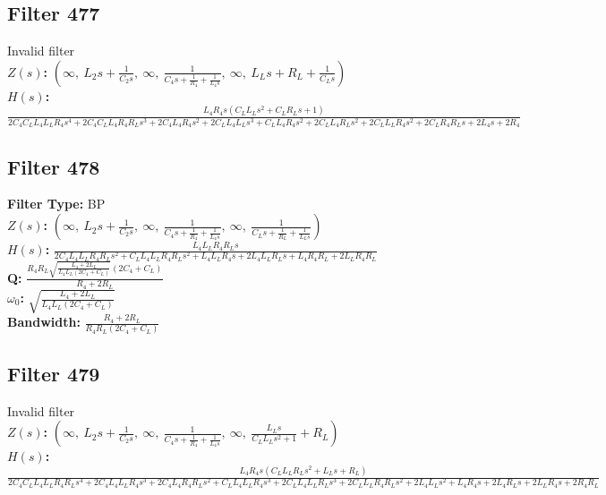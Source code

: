 \documentclass{article}
\begin{document}
\subsection*{Filter 477}
Invalid filter \\ 
\textbf{$Z(s)$:} $\left( \infty, \  L_{2} s + \frac{1}{C_{2} s}, \  \infty, \  \frac{1}{C_{4} s + \frac{1}{R_{4}} + \frac{1}{L_{4} s}}, \  \infty, \  L_{L} s + R_{L} + \frac{1}{C_{L} s}\right)$ \\ 
\textbf{$H(s)$:} $\frac{L_{4} R_{4} s \left(C_{L} L_{L} s^{2} + C_{L} R_{L} s + 1\right)}{2 C_{4} C_{L} L_{4} L_{L} R_{4} s^{4} + 2 C_{4} C_{L} L_{4} R_{4} R_{L} s^{3} + 2 C_{4} L_{4} R_{4} s^{2} + 2 C_{L} L_{4} L_{L} s^{3} + C_{L} L_{4} R_{4} s^{2} + 2 C_{L} L_{4} R_{L} s^{2} + 2 C_{L} L_{L} R_{4} s^{2} + 2 C_{L} R_{4} R_{L} s + 2 L_{4} s + 2 R_{4}}$ \\ 
\subsection*{Filter 478}
\textbf{Filter Type:} BP \\ 
\textbf{$Z(s)$:} $\left( \infty, \  L_{2} s + \frac{1}{C_{2} s}, \  \infty, \  \frac{1}{C_{4} s + \frac{1}{R_{4}} + \frac{1}{L_{4} s}}, \  \infty, \  \frac{1}{C_{L} s + \frac{1}{R_{L}} + \frac{1}{L_{L} s}}\right)$ \\ 
\textbf{$H(s)$:} $\frac{L_{4} L_{L} R_{4} R_{L} s}{2 C_{4} L_{4} L_{L} R_{4} R_{L} s^{2} + C_{L} L_{4} L_{L} R_{4} R_{L} s^{2} + L_{4} L_{L} R_{4} s + 2 L_{4} L_{L} R_{L} s + L_{4} R_{4} R_{L} + 2 L_{L} R_{4} R_{L}}$ \\ 
\textbf{Q:} $\frac{R_{4} R_{L} \sqrt{\frac{L_{4} + 2 L_{L}}{L_{4} L_{L} \left(2 C_{4} + C_{L}\right)}} \left(2 C_{4} + C_{L}\right)}{R_{4} + 2 R_{L}}$ \\ 
\textbf{$\omega_0$:} $\sqrt{\frac{L_{4} + 2 L_{L}}{L_{4} L_{L} \left(2 C_{4} + C_{L}\right)}}$ \\ 
\textbf{Bandwidth:} $\frac{R_{4} + 2 R_{L}}{R_{4} R_{L} \left(2 C_{4} + C_{L}\right)}$ \\ 
\subsection*{Filter 479}
Invalid filter \\ 
\textbf{$Z(s)$:} $\left( \infty, \  L_{2} s + \frac{1}{C_{2} s}, \  \infty, \  \frac{1}{C_{4} s + \frac{1}{R_{4}} + \frac{1}{L_{4} s}}, \  \infty, \  \frac{L_{L} s}{C_{L} L_{L} s^{2} + 1} + R_{L}\right)$ \\ 
\textbf{$H(s)$:} $\frac{L_{4} R_{4} s \left(C_{L} L_{L} R_{L} s^{2} + L_{L} s + R_{L}\right)}{2 C_{4} C_{L} L_{4} L_{L} R_{4} R_{L} s^{4} + 2 C_{4} L_{4} L_{L} R_{4} s^{3} + 2 C_{4} L_{4} R_{4} R_{L} s^{2} + C_{L} L_{4} L_{L} R_{4} s^{3} + 2 C_{L} L_{4} L_{L} R_{L} s^{3} + 2 C_{L} L_{L} R_{4} R_{L} s^{2} + 2 L_{4} L_{L} s^{2} + L_{4} R_{4} s + 2 L_{4} R_{L} s + 2 L_{L} R_{4} s + 2 R_{4} R_{L}}$ \\ 
\end{document}
